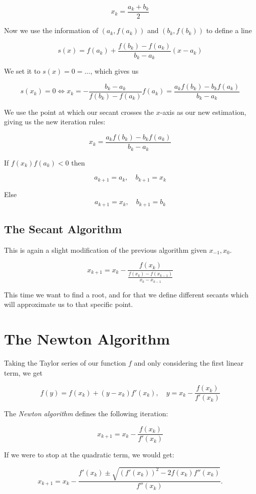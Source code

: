 \[
    x_k = \frac{a_k + b_k}{2}
\]

Now we use the information of \((a_k, f(a_k))\) and \((b_k, f(b_k))\) to define a line

\[
    s(x) = f(a_k) + \frac{f(b_k) - f(a_k)}{b_k - a_k} (x - a_k)
\]

We set it to \(s(x) = 0 = ...\), which gives us

\[
    s(x_k) = 0 \iff x_k = - \frac{b_k - a_k}{f(b_k) - f(a_k)}f(a_k) = \frac{a_kf(b_k) - b_kf(a_k)}{b_k - a_k}
\]

We use the point at which our secant crosses the \(x\)-axis as our new estimation, giving us the new iteration rules:

\[
    x_k = \frac{a_kf(b_k) - b_kf(a_k)}{b_k - a_k}
\]

If \(f(x_k)f(a_k) < 0\) then 

\[
    a_{k + 1} = a_k, \quad b_{k + 1} = x_k
\]

Else
\[
    a_{k + 1} = x_k, \quad b_{k + 1} = b_k
\]


\subsection{The Secant Algorithm}

This is again a slight modification of the previous algorithm given \(x_{ - 1}, x_{0}\). 

\[
    x_{k + 1} = x_k - \frac{f(x_k)}{\frac{f(x_k) - f(x_{k - 1})}{x_k - x_{k - 1}}}
\]

This time we want to find a root, and for that we define different secants which will approximate us 
to that specific point.

\section{The Newton Algorithm}

Taking the Taylor series of our function \(f\) and only considering the first linear term, we get 

\[
    f(y) = f(x_k) + (y - x_k)f'(x_k), \quad y =  x_k - \frac{f(x_k)}{f'(x_k)}
\]

The \emph{Newton algorithm} defines the following iteration:

\[
    x_{k + 1} =  x_k - \frac{f(x_k)}{f'(x_k)}
\]

If we were to stop at the quadratic term, we would get:

\[
    x_{k + 1} =  x_k - \frac{f'(x_k) \pm \sqrt{(f'(x_k))^2 - 2f(x_k)f''(x_k)}}{f''(x_k)}.
\]

